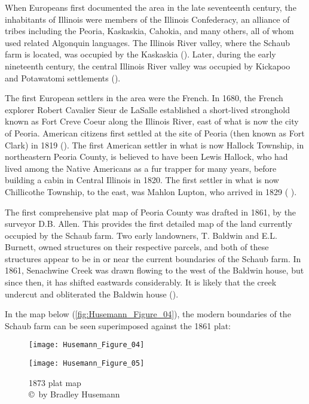 When Europeans first documented the area in the late seventeenth century, the inhabitants of Illinois were members of the Illinois Confederacy, an alliance of tribes including the Peoria, Kaskaskia, Cahokia, and many others, all of whom used related Algonquin languages. The Illinois River valley, where the Schaub farm is located, was occupied by the Kaskaskia (\cite{murphree2012}). Later, during the early nineteenth century, the central Illinois River valley was occupied by Kickapoo and Potawatomi settlements (\cite{wagner2013}).

The first European settlers in the area were the French. In 1680, the French explorer Robert Cavalier Sieur de LaSalle established a short-lived stronghold known as Fort Creve Coeur along the Illinois River, east of what is now the city of Peoria. American citizens first settled at the site of Peoria (then known as Fort Clark) in 1819 (\cite{mcculloch1902}). The first American settler in what is now Hallock Township, in northeastern Peoria County, is believed to have been Lewis Hallock, who had lived among the Native Americans as a fur trapper for many years, before building a cabin in Central Illinois in 1820. The first settler in what is now Chillicothe Township, to the east, was Mahlon Lupton, who arrived in 1829 (\cite{history} %
).

The first comprehensive plat map of Peoria County was drafted in 1861, by the surveyor D.B. Allen. This provides the first detailed map of the land currently occupied by the Schaub farm. Two early landowners, T. Baldwin and E.L. Burnett, owned structures on their respective parcels, and both of these structures appear to be in or near the current boundaries of the Schaub farm. In 1861, Senachwine Creek was drawn flowing to the west of the Baldwin house, but since then, it has shifted eastwards considerably. It is likely that the creek undercut and obliterated the Baldwin house (\cite{allen1861}).

In the map below (\cref{fig:Husemann_Figure_04}), the modern boundaries of the Schaub farm can be seen superimposed against the 1861 plat:

\begin{wrapfigure}{O}[3cm]{0.5\textwidth}
	\texttt{[image: Husemann\_Figure\_04]}
	\caption{1861 plat map
		{\normalfont\scriptsize \\ \copyright\ by Bradley Husemann
	}}
	\label{fig:Husemann_Figure_04}

	\texttt{[image: Husemann\_Figure\_05]}
	\caption{1873 plat map
		{\normalfont\scriptsize \\ \copyright\ by Bradley Husemann
	}}
	\label{fig:Husemann_Figure_05}
\end{wrapfigure}

